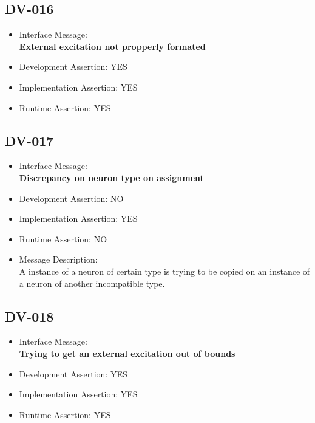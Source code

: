 \subsection{DV-016}
\begin{itemize}
  \item Interface Message:\\[1em]
    \textbf{External excitation not propperly formated}
  \item Development Assertion: YES
  \item Implementation Assertion: YES
  \item Runtime Assertion: YES
\end{itemize}

\subsection{DV-017}
\begin{itemize}
  \item Interface Message:\\[1em]
    \textbf{Discrepancy on neuron type on assignment}
  \item Development Assertion: NO
  \item Implementation Assertion: YES
  \item Runtime Assertion: NO
  \item Message Description:\\[1em]
    A instance of a neuron of certain type is trying to be copied on an instance of a neuron of another incompatible type.
\end{itemize}

\subsection{DV-018}
\begin{itemize}
  \item Interface Message:\\[1em]
    \textbf{Trying to get an external excitation out of bounds}
  \item Development Assertion: YES
  \item Implementation Assertion: YES
  \item Runtime Assertion: YES
\end{itemize}

